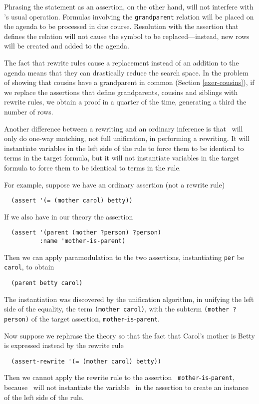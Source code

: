 Phrasing the statement as an assertion, on the other hand, will not
interfere with \snark\/'s usual operation.  Formulas involving the
{\tt grandparent} relation will be placed on the agenda to be
processed in due course.  Resolution with the assertion that defines
the relation will not cause the symbol to be replaced---instead, new
rows will be created and added to the agenda.

The fact that rewrite rules cause a replacement instead of an addition
to the agenda means that they can drastically reduce the search
space.  In the problem of showing that cousins have a grandparent in
common (Section \ref{exer-cousins}), if we replace the assertions that
define grandparents, cousins and siblings with rewrite rules, we obtain
a proof in a quarter of the time, generating a third the number of
rows.

Another difference between a rewriting and an ordinary inference is
that \snark\  will only do one-way matching, not full unification, in
performing a rewriting.  It will instantiate variables in the left
side of the rule to force them to be identical to terms in the target
formula, but it will not instantiate variables in the target formula
to force them to be identical to terms in the rule.

For example, suppose we have an ordinary
assertion (not a rewrite rule)
\begin{verbatim}
  (assert '(= (mother carol) betty))
\end{verbatim}
If we also have in our theory the assertion
\begin{verbatim}
  (assert '(parent (mother ?person) ?person)
          :name 'mother-is-parent)
\end{verbatim}
Then we can apply paramodulation to the two assertions, instantiating
{\tt per} be {\tt carol}, to obtain
\begin{verbatim}
  (parent betty carol)
\end{verbatim}
The instantiation was discovered by the
unification algorithm, in unifying the left side of the equality, the term
\verb'(mother carol)', with the subterm \verb'(mother ?person)' of the target
assertion, {\tt mother}-{\tt is}-{\tt parent}.

Now suppose we rephrase the theory so that the fact that Carol's mother
is Betty is expressed instead by the rewrite rule
\begin{verbatim}
  (assert-rewrite '(= (mother carol) betty))
\end{verbatim}
Then we cannot apply the rewrite rule to the assertion {\tt
mother}-{\tt is}-{\tt parent}, because \snark\
will not instantiate the variable \varx\  in the assertion to create
an instance of the left side of the rule.


